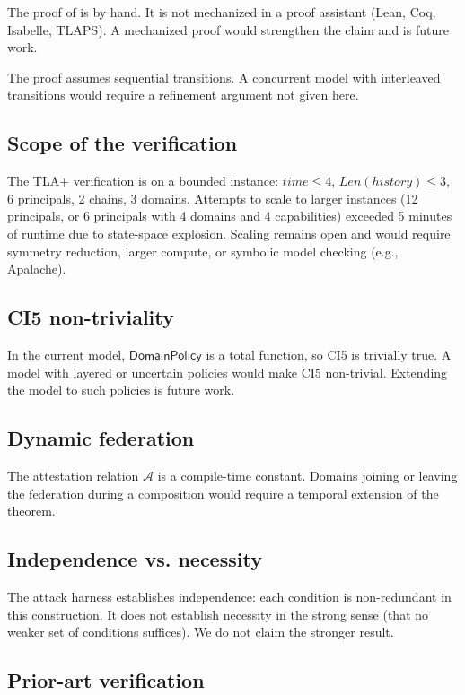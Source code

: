 \documentclass[11pt,a4paper]{article}
\theoremstyle{plain}
\theoremstyle{definition}
\theoremstyle{remark}
\begin{document}
The proof of  is by hand. It is not mechanized in a
proof assistant (Lean, Coq, Isabelle, TLAPS). A mechanized proof would
strengthen the claim and is future work.

The proof assumes sequential transitions. A concurrent model with interleaved
transitions would require a refinement argument not given here.

\subsection*{Scope of the verification}

The TLA+ verification is on a bounded instance: $\mathit{time} \le 4$,
$\mathit{Len}(\mathit{history}) \le 3$, 6 principals, 2 chains, 3 domains.
Attempts to scale to larger instances (12 principals, or 6 principals with 4
domains and 4 capabilities) exceeded 5 minutes of runtime due to state-space
explosion. Scaling remains open and would require symmetry reduction, larger
compute, or symbolic model checking (e.g., Apalache).

\subsection*{CI5 non-triviality}

In the current model, $\mathsf{DomainPolicy}$ is a total function, so CI5 is
trivially true. A model with layered or uncertain policies would make CI5
non-trivial. Extending the model to such policies is future work.

\subsection*{Dynamic federation}

The attestation relation $\mathcal{A}$ is a compile-time constant. Domains
joining or leaving the federation during a composition would require a
temporal extension of the theorem.

\subsection*{Independence vs. necessity}

The attack harness establishes independence: each condition is non-redundant
in this construction. It does not establish necessity in the strong sense
(that no weaker set of conditions suffices). We do not claim the stronger
result.

\subsection*{Prior-art verification}
\end{document}

